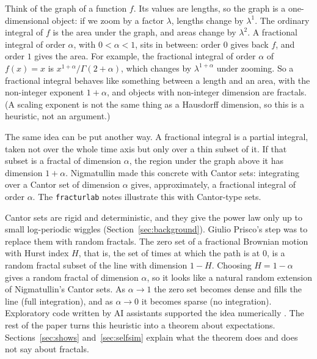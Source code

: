 \documentclass[11pt]{article}
\theoremstyle{remark}
\theoremstyle{definition}
\begin{document}
Think of the graph of a function $f$. Its values are lengths, so the graph is a one-dimensional object: if we zoom by a factor $\lambda$, lengths change by $\lambda^1$. The ordinary integral of $f$ is the area under the graph, and areas change by $\lambda^2$. A fractional integral of order $\alpha$, with $0<\alpha<1$, sits in between: order $0$ gives back $f$, and order $1$ gives the area. For example, the fractional integral of order $\alpha$ of $f(x)=x$ is $x^{1+\alpha}/\Gamma(2+\alpha)$, which changes by $\lambda^{1+\alpha}$ under zooming. So a fractional integral behaves like something between a length and an area, with the non-integer exponent $1+\alpha$, and objects with non-integer dimension are fractals. (A scaling exponent is not the same thing as a Hausdorff dimension, so this is a heuristic, not an argument.)

The same idea can be put another way. A fractional integral is a partial integral, taken not over the whole time axis but only over a thin subset of it. If that subset is a fractal of dimension $\alpha$, the region under the graph above it has dimension $1+\alpha$. Nigmatullin \cite{Nig92} made this concrete with Cantor sets: integrating over a Cantor set of dimension $\alpha$ gives, approximately, a fractional integral of order $\alpha$. The \texttt{fracturlab} notes illustrate this with Cantor-type sets.

Cantor sets are rigid and deterministic, and they give the power law only up to small log-periodic wiggles (Section~\ref{sec:background}). Giulio Prisco's step was to replace them with random fractals. The zero set of a fractional Brownian motion with Hurst index $H$, that is, the set of times at which the path is at $0$, is a random fractal subset of the line with dimension $1-H$. Choosing $H=1-\alpha$ gives a random fractal of dimension $\alpha$, so it looks like a natural random extension of Nigmatullin's Cantor sets. As $\alpha\to1$ the zero set becomes dense and fills the line (full integration), and as $\alpha\to0$ it becomes sparse (no integration). Exploratory code written by AI assistants supported the idea numerically \cite{fracturlab,Pri26}. The rest of the paper turns this heuristic into a theorem about expectations. Sections~\ref{sec:shows} and~\ref{sec:selfsim} explain what the theorem does and does not say about fractals.
\end{document}
